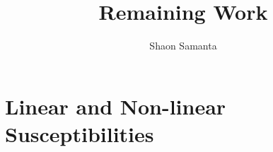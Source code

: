 \documentclass[a4paper,12pt]{article}
\title{Remaining Work}
\author{Shaon Samanta}
\date{}
\begin{document}
\onehalfspacing
\makeatletter
\def\@maketitle{
\begin{center}
\vspace*{0.4cm}
{\Huge \@title }\\[0.5ex]
{\large \bfseries \textit{Modulation instability in semiconductor quantum dots (Y-type excitation scheme)} }\\[1.3ex]
{\@author }\\[5ex]
\end{center}}
\makeatother


\section{Linear and Non-linear Susceptibilities}
\end{document}
